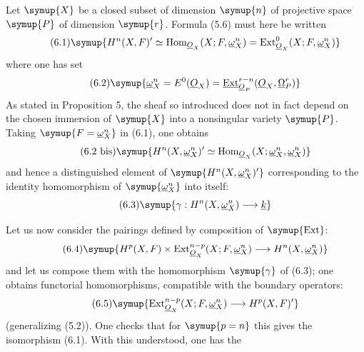 Let $\symup{X}$ be a closed subset of dimension $\symup{n}$ of projective space $\symup{P}$ of
dimension $\symup{r}$. Formula (5.6) must here be written
\begin{equation}\tag{6.1}
  \symup{H^{n}(X,F)'
  \simeq\operatorname{Hom}_{\Osh_X}(X;F,\underline{\omega}_X^{n})
  =\operatorname{Ext}_{\Osh_X}^{0}(X;F,\underline{\omega}_X^{n})}
\end{equation}
where one has set
\begin{equation}\tag{6.2}
  \symup{\underline{\omega}_X^{n}=E^{0}(\Osh_X)
  =\Extsh_{\Osh_P}^{r-n}(\Osh_X,\underline{\Omega}_P^{r})}
\end{equation}
As stated in Proposition 5, the sheaf so introduced does not in fact depend on
the chosen immersion of $\symup{X}$ into a nonsingular variety $\symup{P}$. Taking
$\symup{F=\underline{\omega}_X^{n}}$ in (6.1), one obtains
\begin{equation}\tag{6.2 bis}
  \symup{H^{n}(X,\underline{\omega}_X^{n})'
  \simeq\operatorname{Hom}_{\Osh_X}(X;\underline{\omega}_X^{n},\underline{\omega}_X^{n})}
\end{equation}
and hence a distinguished element
of $\symup{H^{n}(X,\underline{\omega}_X^{n})'}$ corresponding to the identity homomorphism of
$\symup{\underline{\omega}_X^{n}}$ into itself:
\begin{equation}\tag{6.3}
  \symup{\gamma:H^{n}(X,\underline{\omega}_X^{n})\longrightarrow\underline{k}}
\end{equation}

Let us now consider the pairings defined by composition of $\symup{\operatorname{Ext}}$:
\begin{equation}\tag{6.4}
  \symup{H^{p}(X,F)\times
  \operatorname{Ext}_{\Osh_X}^{n-p}(X;F,\underline{\omega}_X^{n})
  \longrightarrow H^{n}(X,\underline{\omega}_X^{n})}
\end{equation}
and let us compose them with the homomorphism $\symup{\gamma}$ of (6.3); one obtains functorial
homomorphisms, compatible with the boundary operators:
\begin{equation}\tag{6.5}
  \symup{\operatorname{Ext}_{\Osh_X}^{n-p}(X;F,\underline{\omega}_X^{n})
  \longrightarrow H^{p}(X,F)'}
\end{equation}
(generalizing (5.2)). One checks that for $\symup{p=n}$ this gives the isomorphism
(6.1). With this understood, one has the

